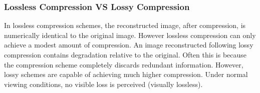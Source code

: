 \subsubsection{Lossless Compression VS Lossy Compression}
In lossless compression schemes, the reconstructed image, after compression, is numerically identical to the original image. However lossless compression can only achieve a modest amount of compression. An image reconstructed following lossy compression contains degradation relative to the original. Often this is because the compression scheme completely discards redundant information. However, lossy schemes are capable of achieving much higher compression. Under normal viewing conditions, no visible loss is perceived (visually lossless)\cite{Dhawan:2011}.